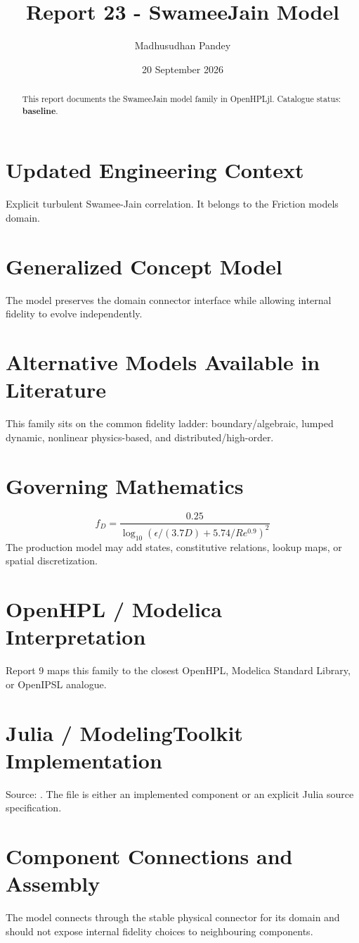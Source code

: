 \documentclass[10pt,a4paper]{article}
\title{Report 23 - SwameeJain Model}
\author{Madhusudhan Pandey}
\date{20 September 2026}
\begin{document}
\maketitle
\begin{abstract}This report documents the SwameeJain model family in OpenHPLjl. Catalogue status: \textbf{baseline}.\end{abstract}
\section{Updated Engineering Context}Explicit turbulent Swamee-Jain correlation. It belongs to the Friction models domain.
\section{Generalized Concept Model}The model preserves the domain connector interface while allowing internal fidelity to evolve independently.
\section{Alternative Models Available in Literature}This family sits on the common fidelity ladder: boundary/algebraic, lumped dynamic, nonlinear physics-based, and distributed/high-order.
\section{Governing Mathematics}\[f_D=\frac{0.25}{\log_{10}(\epsilon/(3.7D)+5.74/Re^{0.9})^2}\]The production model may add states, constitutive relations, lookup maps, or spatial discretization.
\section{OpenHPL / Modelica Interpretation}Report 9 maps this family to the closest OpenHPL, Modelica Standard Library, or OpenIPSL analogue.
\section{Julia / ModelingToolkit Implementation}Source: \texttt{}. The file is either an implemented component or an explicit Julia source specification.
\section{Component Connections and Assembly}The model connects through the stable physical connector for its domain and should not expose internal fidelity choices to neighbouring components.
\end{document}
